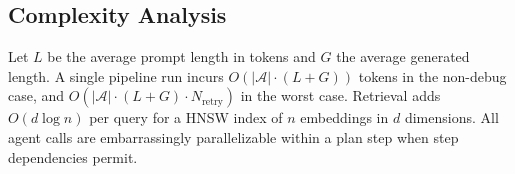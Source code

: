 \subsection{Complexity Analysis}
\label{sec:complexity}

Let $L$ be the average prompt length in tokens and $G$ the
average generated length. A single pipeline run incurs
$O(|\mathcal{A}| \cdot (L + G))$ tokens in the non-debug
case, and $O(|\mathcal{A}| \cdot (L + G) \cdot N_\text{retry})$
in the worst case. Retrieval adds $O(d \log n)$ per query
for a HNSW index of $n$ embeddings in $d$ dimensions. All
agent calls are embarrassingly parallelizable within a plan
step when step dependencies permit.
